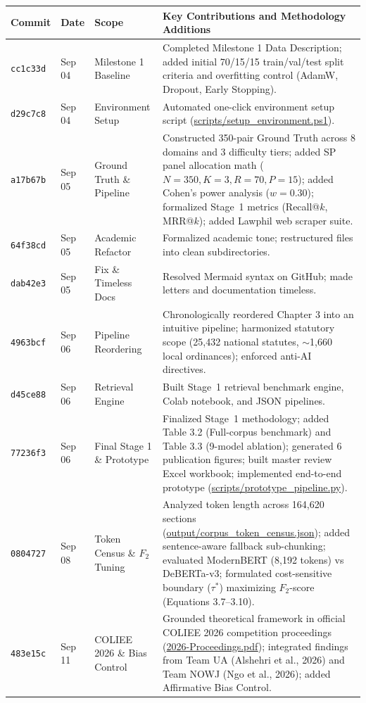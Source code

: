 \documentclass[10pt,letterpaper]{article}
\begin{document}
\vspace{0.4em}
\noindent\begin{tabularx}{\linewidth}{@{}lllX@{}}
    \toprule
    \textbf{Commit} & \textbf{Date} & \textbf{Scope} & \textbf{Key Contributions and Methodology Additions} \\
    \midrule
    \texttt{cc1c33d} & Sep 04 & Milestone 1 Baseline & Completed Milestone 1 Data Description; added initial 70/15/15 train/val/test split criteria and overfitting control (AdamW, Dropout, Early Stopping). \\
    \texttt{d29c7c8} & Sep 04 & Environment Setup & Automated one-click environment setup script (\url{scripts/setup_environment.ps1}). \\
    \texttt{a17b67b} & Sep 05 & Ground Truth \& Pipeline & Constructed 350-pair Ground Truth across 8 domains and 3 difficulty tiers; added SP panel allocation math ($N=350, K=3, R=70, P=15$); added Cohen's power analysis ($w=0.30$); formalized Stage~1 metrics (Recall@$k$, MRR@$k$); added Lawphil web scraper suite. \\
    \texttt{64f38cd} & Sep 05 & Academic Refactor & Formalized academic tone; restructured files into clean subdirectories. \\
    \texttt{dab42e3} & Sep 05 & Fix \& Timeless Docs & Resolved Mermaid syntax on GitHub; made letters and documentation timeless. \\
    \texttt{4963bcf} & Sep 06 & Pipeline Reordering & Chronologically reordered Chapter 3 into an intuitive pipeline; harmonized statutory scope (25,432 national statutes, $\sim$1,660 local ordinances); enforced anti-AI directives. \\
    \texttt{d45ce88} & Sep 06 & Retrieval Engine & Built Stage~1 retrieval benchmark engine, Colab notebook, and JSON pipelines. \\
    \texttt{77236f3} & Sep 06 & Final Stage 1 \& Prototype & Finalized Stage~1 methodology; added Table 3.2 (Full-corpus benchmark) and Table 3.3 (9-model ablation); generated 6 publication figures; built master review Excel workbook; implemented end-to-end prototype (\url{scripts/prototype_pipeline.py}). \\
    \texttt{0804727} & Sep 08 & Token Census \& $F_2$ Tuning & Analyzed token length across 164,620 sections (\url{output/corpus_token_census.json}); added sentence-aware fallback sub-chunking; evaluated ModernBERT (8,192 tokens) vs DeBERTa-v3; formulated cost-sensitive boundary ($\tau^*$) maximizing $F_2$-score (Equations 3.7--3.10). \\
    \texttt{483e15c} & Sep 11 & COLIEE 2026 \& Bias Control & Grounded theoretical framework in official COLIEE 2026 competition proceedings (\url{2026-Proceedings.pdf}); integrated findings from Team UA (Alshehri et al., 2026) and Team NOWJ (Ngo et al., 2026); added Affirmative Bias Control. \\
    \bottomrule
\end{tabularx}
\end{document}
